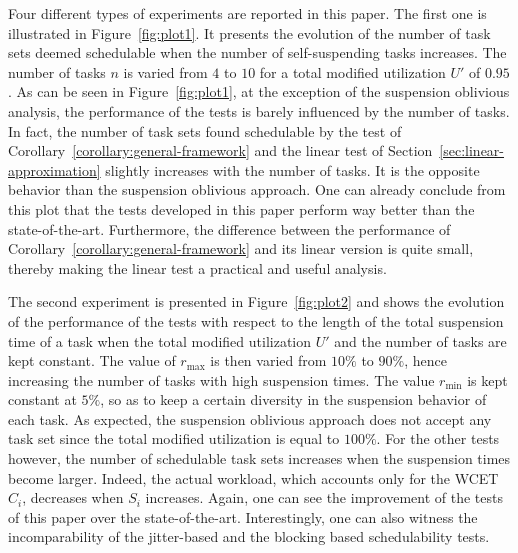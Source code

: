 Four different types of experiments are reported in this paper. The first one is illustrated in Figure~\ref{fig:plot1}. It presents the evolution of the number of task sets deemed schedulable when the number of self-suspending tasks increases. The number of tasks $n$ is varied from $4$ to $10$ for a total modified utilization $U'$ of $0.95$. As can be seen in Figure~\ref{fig:plot1}, at the exception of the suspension oblivious analysis, the performance of the tests is barely influenced by the number of tasks. In fact, the number of task sets found schedulable by the test of Corollary~\ref{corollary:general-framework} and the linear test of Section~\ref{sec:linear-approximation} slightly increases with the number of tasks. It is the opposite behavior than the suspension oblivious approach. One can already conclude from this plot that the tests developed in this paper perform way better than the state-of-the-art. Furthermore, the difference between the performance of Corollary~\ref{corollary:general-framework} and its linear version is quite small, thereby making the linear test a practical and useful analysis.

The second experiment is presented in Figure~\ref{fig:plot2} and shows the evolution of the performance of the tests with respect to the length of the total suspension time of a task when the total modified utilization $U'$ and the number of tasks are kept constant. The value of $r_{\max}$ is then varied from $10\%$ to $90\%$, hence increasing the number of tasks with high suspension times. The value $r_{\min}$ is kept constant at $5\%$, so as to keep a certain diversity in the suspension behavior of each task. As expected, the suspension oblivious approach does not accept any task set since the total modified utilization is equal to $100\%$. For the other tests however, the number of schedulable task sets increases when the suspension times become larger. Indeed, the actual workload, which accounts only for the WCET $C_i$, decreases when $S_i$ increases. Again, one can see the improvement of the tests of this paper over the state-of-the-art. Interestingly, one can also witness the incomparability of the jitter-based and the blocking based schedulability tests. %

